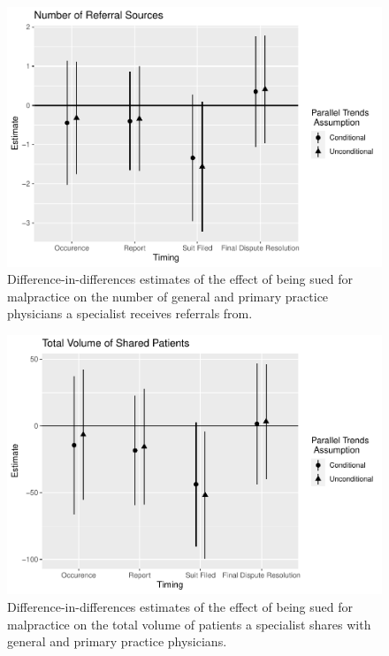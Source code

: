 \documentclass[
  12pt,
]{article}
\begin{document}
\begin{figure}
\centering
\includegraphics{Paper_files/figure-latex/nsrcatt-1.pdf}
\caption{\label{fig:nsrcatt}Difference-in-differences estimates of the effect of being sued for malpractice on the number of general and primary practice physicians a specialist receives referrals from.}
\end{figure}

\begin{figure}
\centering
\includegraphics{Paper_files/figure-latex/volatt-1.pdf}
\caption{\label{fig:volatt}Difference-in-differences estimates of the effect of being sued for malpractice on the total volume of patients a specialist shares with general and primary practice physicians.}
\end{figure}
\end{document}
